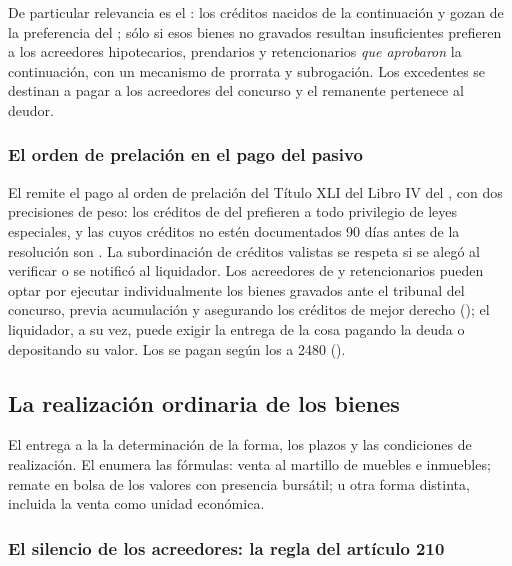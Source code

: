 De particular relevancia es el : los créditos nacidos de la continuación  y gozan de la preferencia del 
; sólo si esos bienes no gravados resultan insuficientes prefieren a los acreedores
hipotecarios, prendarios y retencionarios \emph{que aprobaron} la continuación, con un mecanismo de
prorrata y subrogación. Los excedentes se destinan a pagar a los acreedores del concurso y el
remanente pertenece al deudor.

\subsubsection{El orden de prelación en el pago del pasivo}

El  remite el pago al orden de prelación del Título XLI del Libro IV del \cc{}, con dos
precisiones de peso: los créditos de  del  prefieren a todo
privilegio de leyes especiales, y las  cuyos créditos no estén
documentados 90 días antes de la resolución son .
La subordinación de créditos valistas se respeta si se alegó al verificar o se notificó al
liquidador. Los acreedores de  y retencionarios pueden optar por ejecutar
individualmente los bienes gravados ante el tribunal del concurso, previa acumulación y asegurando
los créditos de mejor derecho (); el liquidador, a su vez, puede exigir la entrega de la
cosa pagando la deuda o depositando su valor. Los  se pagan según los
 a 2480 ().

\subsection{La realización ordinaria de los bienes}

El  entrega a la  la determinación de la forma, los
plazos y las condiciones de realización. El  enumera las fórmulas: venta al martillo
de muebles e inmuebles; remate en bolsa de los valores con presencia bursátil; u otra forma
distinta, incluida la venta como unidad económica.

\subsubsection{El silencio de los acreedores: la regla del artículo 210}

